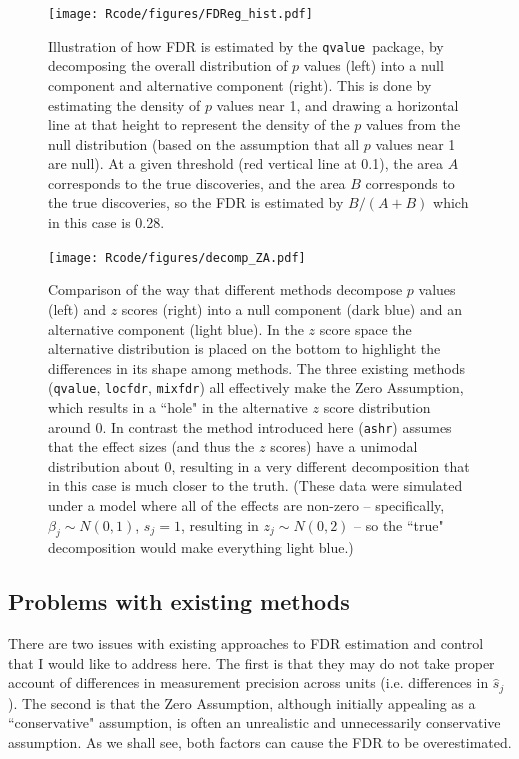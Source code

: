 \documentclass[11pt]{article}
\def\shat{\hat{s}}
\def\qvalue{{\tt qvalue}\xspace}
\def\locfdr{{\tt locfdr}\xspace}
\def\mixfdr{{\tt mixfdr}\xspace}
\def\ashr{{\tt ashr}\xspace}
\begin{document}
\begin{figure}
\texttt{[image: Rcode/figures/FDReg\_hist.pdf]}
\caption{Illustration of how FDR is estimated by the \qvalue \, package, by decomposing the overall distribution of $p$ values (left) into a null component and alternative component (right). This is done by estimating the density of $p$ values near 1, and drawing a horizontal line at that height to represent the density of the $p$ values from the null distribution (based on the assumption that all $p$ values near 1 are null).
At a given threshold (red vertical line at 0.1), the area $A$ corresponds to the true discoveries, and the area $B$ corresponds to the true discoveries,
so the FDR is estimated by $B/(A+B)$ which in this case is 0.28.} \label{fig:qvalue}
\end{figure}

\begin{figure}
\center \texttt{[image: Rcode/figures/decomp\_ZA.pdf]}
\caption{Comparison of the way that different methods decompose $p$ values (left) and $z$ scores (right) into a null component (dark blue) and an alternative component (light blue). In the $z$ score space the alternative distribution is placed on the bottom to highlight the differences in its shape among methods.
The three existing methods (\qvalue, \locfdr, \mixfdr) all effectively make the Zero Assumption, which results in a ``hole" in the alternative $z$ score distribution around 0.
In contrast the method introduced here (\ashr) assumes that the effect sizes (and thus the $z$ scores) have a unimodal distribution about 0, resulting in a very different decomposition that in this case is much closer to the truth. (These data were simulated under a model where all of the effects are non-zero -- specifically, $\beta_j \sim N(0,1)$, $s_j=1$, resulting in $z_j \sim N(0,2)$ -- so the ``true" decomposition would make everything light blue.)} \label{fig:ZA}
\end{figure}




\subsection*{Problems with existing methods}

 There are two issues with existing approaches to FDR estimation and control that I would like to address here. 
 The first is that they may do not take proper account of differences in measurement precision across units (i.e. differences in $\shat_j$). 
 The second is that the Zero Assumption, although initially appealing as a ``conservative" assumption,
  is often an unrealistic and unnecessarily conservative assumption. As we shall see, both factors can cause the FDR to be overestimated.
 
\end{document}
